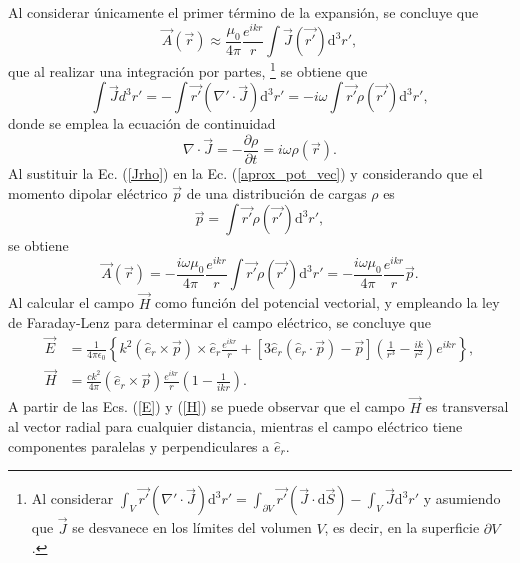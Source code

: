 Al considerar únicamente el primer término de la expansión, se concluye que 
\begin{equation}
    \Vec{A}(\Vec{r})\approx\frac{\mu_0}{4\pi}\frac{e^{ikr}}{r}\int \Vec{J}(\Vec{r'}) \text{d}^3r',    
    \label{aprox_pot_vec}
\end{equation}
que al realizar una integración por partes,  \footnote{Al considerar $\int_V \Vec{r'}(\nabla'\cdot\Vec{J})\text{d}^3r'=\int_{\partial V} \Vec{r'}(\Vec{J}\cdot \text{d}\Vec{S})-\int_V \Vec{J}\text{d}^3r'$ y asumiendo que $\Vec{J}$ se desvanece en los límites del volumen $V$, es decir, en la superficie $\partial V$. } se obtiene que
\begin{equation}
	\int\Vec{J}d^3r'=-\int \Vec{r'}(\nabla'\cdot\Vec{J})\text{d}^3r'=-i\omega\int \Vec{r'}\rho(\Vec{r'})\text{d}^3r',
	\label{Jrho}
\end{equation}
donde se emplea la ecuación de continuidad
\begin{equation*}
    \nabla\cdot\Vec{J}=-\frac{\partial\rho}{\partial t}=i\omega\rho(\Vec{r}). 
\end{equation*}
Al sustituir la Ec. (\ref{Jrho}) en la Ec. (\ref{aprox_pot_vec}) y considerando que el momento dipolar eléctrico $\Vec{p}$ de una distribución de cargas $\rho$ es
\begin{equation*}
	\Vec{p}=\int \Vec{r'}\rho(\Vec{r'})\text{d}^3r',
\end{equation*}
se obtiene 
\begin{equation}
    \Vec{A}(\Vec{r})=-\frac{i\omega\mu_0}{4\pi}\frac{e^{ikr}}{r}\int \Vec{r'}\rho(\Vec{r'})\text{d}^3r'=-\frac{i\omega\mu_0}{4\pi}\frac{e^{ikr}}{r}\Vec{p}. 
    \label{A_dip}  
\end{equation}
Al calcular el campo $\Vec{H}$ como función del potencial vectorial, y empleando la ley de Faraday-Lenz para determinar el campo eléctrico, se concluye que \cite{Jackson}
\begin{align}
	\Vec{E}&=\frac{1}{4\pi\epsilon_0}\left\{k^2(\hat{e}_r\times\Vec{p})\times\hat{e}_r\frac{e^{ikr}}{r}+[3\hat{e}_r(\hat{e}_r\cdot\Vec{p})-\Vec{p}]\left(\frac{1}{r^3}-\frac{ik}{r^2}\right)e^{ikr}\right\},\label{E}\\
    \Vec{H}&=\frac{ck^2}{4\pi}(\hat{e}_r\times\Vec{p})\frac{e^{ikr}}{r}\left(1-\frac{1}{ikr}\right).    \label{H}
\end{align}
A partir de las Ecs. (\ref{E})  y (\ref{H}) se puede observar que el campo $\Vec{H}$ es transversal al vector radial para cualquier distancia, mientras el campo eléctrico tiene componentes paralelas y perpendiculares a $\hat{e}_r$.\\ 

